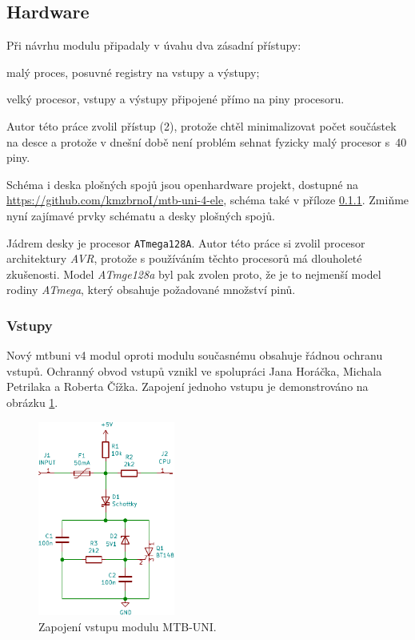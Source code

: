 \subsection{Hardware}

Při návrhu modulu připadaly v úvahu dva zásadní přístupy:

\begin{compactenum}
\item malý proces, posuvné registry na vstupy a výstupy;
\item velký procesor, vstupy a výstupy připojené přímo na piny procesoru.
\end{compactenum}

Autor této práce zvolil přístup (2), protože chtěl minimalizovat počet
součástek na desce a protože v dnešní době není problém sehnat fyzicky malý
procesor s~40 piny.

Schéma i deska plošných spojů jsou openhardware projekt, dostupné na
\url{https://github.com/kmzbrnoI/mtb-uni-4-ele}, schéma také v příloze
\ref{}. Zmiňme nyní zajímavé prvky schématu a desky plošných spojů.

Jádrem desky je procesor \texttt{ATmega128A}. Autor této práce si zvolil
procesor architektury \textit{AVR}, protože s používáním těchto procesorů má
dlouholeté zkušenosti. Model \textit{ATmge128a} byl pak zvolen proto, že je to
nejmenší model rodiny \textit{ATmega}, který obsahuje požadované množství pinů.

\subsubsection{Vstupy}

Nový \gls{mtbuni} v4 modul oproti modulu současnému obsahuje řádnou ochranu
vstupů. Ochranný obvod vstupů vznikl ve spolupráci Jana Horáčka, Michala
Petrilaka a Roberta Čížka. Zapojení jednoho vstupu je demonstrováno na obrázku
\ref{fig:mtbuni-input}.

\begin{figure}[ht]
\includegraphics[width=0.4\textwidth]{data/uni-input/uni-input.pdf}
\caption{Zapojení vstupu modulu MTB-UNI.}
\label{fig:mtbuni-input}
\end{figure}

